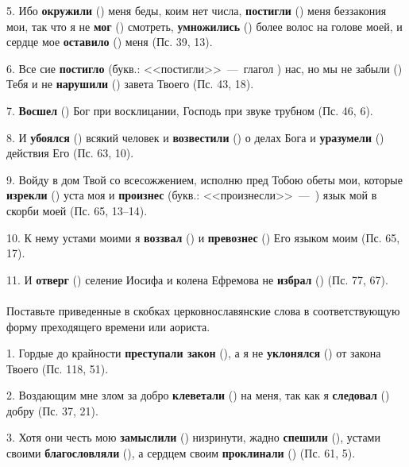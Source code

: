 \documentclass[11pt,a4paper,oneside]{memoir}
\newcommand{\exercise}{}
\begin{document}
    5. Ибо \textbf{окружили} ({}) меня беды, коим нет числа, \textbf{постигли} ({}) меня беззакония мои, так что я не \textbf{мог} ({}) смотреть, \textbf{умножились} ({}) более волос на голове моей, и сердце мое \textbf{оставило} ({}) меня (Пс. 39, 13).
    
    6. Все сие \textbf{постигло} (букв.: <<постигли>>~---~глагол {}) нас, но мы не забыли ({}) Тебя и не \textbf{нарушили} ({}) завета Твоего (Пс. 43, 18).
    
    7. \textbf{Восшел} ({}) Бог при восклицании, Господь при звуке трубном (Пс. 46, 6).
    
    8. И \textbf{убоялся} ({}) всякий человек и \textbf{возвестили} ({}) о делах Бога и \textbf{уразумели} ({}) действия Его (Пс. 63, 10).
    
    9. Войду в дом Твой со всесожжением, исполню пред Тобою обеты мои, которые \textbf{изрекли} ({}) уста моя и \textbf{произнес} (букв.: <<произнесли>>~---~{}) язык мой в скорби моей (Пс. 65, 13--14).
    
    10. К нему устами моими я \textbf{воззвал} ({}) и \textbf{превознес} ({}) Его языком моим (Пс. 65, 17).
    
    11. И \textbf{отверг} ({}) селение Иосифа и колена Ефремова не \textbf{избрал} ({}) (Пс. 77, 67).
    
                    \paragraph{\exercise}
                    
    Поставьте приведенные в скобках церковнославянские слова в соответствующую форму преходящего времени или аориста.
    
    1. Гордые до крайности \textbf{преступали закон} ({}), а я не \textbf{уклонялся} ({}) от закона Твоего (Пс. 118, 51).
    
    2. Воздающим мне злом за добро \textbf{клеветали} ({}) на меня, так как я \textbf{следовал} ({}) добру (Пс. 37, 21).
    
    3. Хотя они честь мою \textbf{замыслили} ({}) низринути, жадно \textbf{спешили} ({}), устами своими \textbf{благословляли} ({}), а сердцем своим \textbf{проклинали} ({}) (Пс. 61, 5).
    
\end{document}
